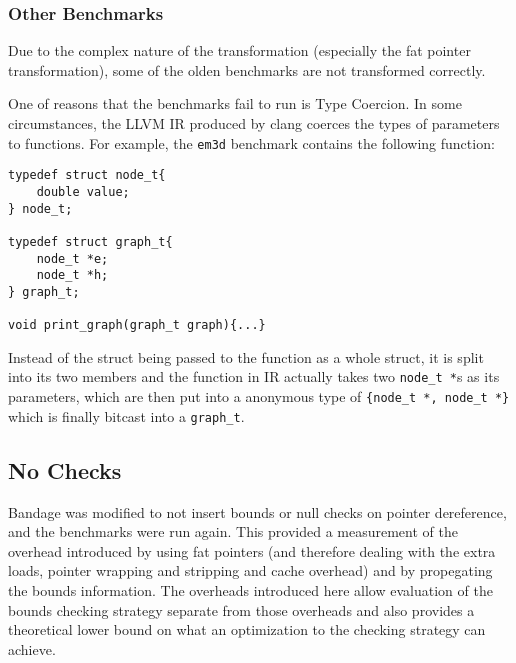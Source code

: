 \subsubsection{Other Benchmarks}

Due to the complex nature of the transformation (especially the fat pointer transformation), some of the olden benchmarks are not transformed correctly.


One of reasons that the benchmarks fail to run is Type Coercion.
In some circumstances, the LLVM IR produced by clang coerces the types of parameters to functions.
For example, the \verb!em3d! benchmark contains the following function:

\begin{verbatim}
typedef struct node_t{
    double value;
} node_t;

typedef struct graph_t{
    node_t *e;
    node_t *h;
} graph_t;

void print_graph(graph_t graph){...}
\end{verbatim}

Instead of the struct being passed to the function as a whole struct, it is split into its two members and the function in IR actually takes two \verb!node_t *!s as its parameters, which are then put into a anonymous type of \verb!{node_t *, node_t *}! which is finally bitcast into a \verb!graph_t!.

\subsection{No Checks}

Bandage was modified to not insert bounds or null checks on pointer dereference, and the benchmarks were run again.
This provided a measurement of the overhead introduced by using fat pointers (and therefore dealing with the extra loads, pointer wrapping and stripping and cache overhead) and by propegating the bounds information.
The overheads introduced here allow evaluation of the bounds checking strategy separate from those overheads and also provides a theoretical lower bound on what an optimization to the checking strategy can achieve.

